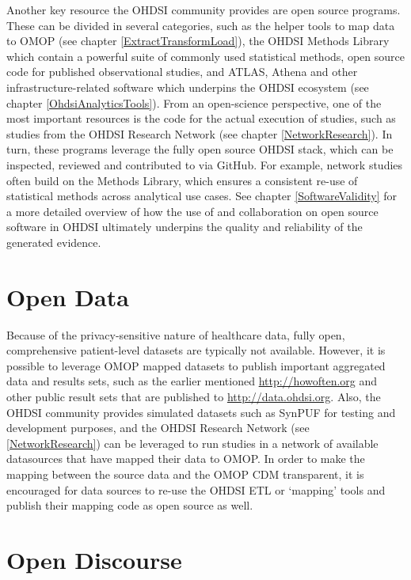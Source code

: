 \documentclass[11pt]{book}
\theoremstyle{definition}
\theoremstyle{definition}
\theoremstyle{definition}
\theoremstyle{remark}
\begin{document}
Another key resource the OHDSI community provides are open source programs. These can be divided in several categories, such as the helper tools to map data to OMOP (see chapter \ref{ExtractTransformLoad}), the OHDSI Methods Library which contain a powerful suite of commonly used statistical methods, open source code for published observational studies, and ATLAS, Athena and other infrastructure-related software which underpins the OHDSI ecosystem (see chapter \ref{OhdsiAnalyticsTools}). From an open-science perspective, one of the most important resources is the code for the actual execution of studies, such as studies from the OHDSI Research Network (see chapter \ref{NetworkResearch}). In turn, these programs leverage the fully open source OHDSI stack, which can be inspected, reviewed and contributed to via GitHub. For example, network studies often build on the Methods Library, which ensures a consistent re-use of statistical methods across analytical use cases. See chapter \ref{SoftwareValidity} for a more detailed overview of how the use of and collaboration on open source software in OHDSI ultimately underpins the quality and reliability of the generated evidence.

\hypertarget{open-data}{%
\section{Open Data}\label{open-data}}


Because of the privacy-sensitive nature of healthcare data, fully open, comprehensive patient-level datasets are typically not available. However, it is possible to leverage OMOP mapped datasets to publish important aggregated data and results sets, such as the earlier mentioned \url{http://howoften.org} and other public result sets that are published to \url{http://data.ohdsi.org}. Also, the OHDSI community provides simulated datasets such as SynPUF for testing and development purposes, and the OHDSI Research Network (see \ref{NetworkResearch}) can be leveraged to run studies in a network of available datasources that have mapped their data to OMOP. In order to make the mapping between the source data and the OMOP CDM transparent, it is encouraged for data sources to re-use the OHDSI ETL or `mapping' tools and publish their mapping code as open source as well.

\hypertarget{open-discourse}{%
\section{Open Discourse}\label{open-discourse}}
\end{document}
